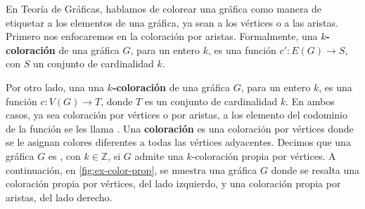 En Teor\'ia de Gr\'aficas, hablamos de colorear una gr\'afica como manera de
etiquetar a los elementos de una gr\'afica, ya sean a los v\'ertices o a las
aristas. Primero nos enfocaremos en la coloraci\'on por aristas. Formalmente,
una \textbf{$k$-coloraci\'on}  de una gr\'afica $G$, para un entero $k$,
es una funci\'on $c' \colon E(G)\to S$, con $S$ un conjunto de cardinalidad $k$.

Por otro lado, una una \textbf{$k$-coloraci\'on}
 de
una gr\'afica $G$, para un entero $k$, es una funci\'on $c \colon V(G)\to T$,
donde $T$ es un conjunto de cardinalidad $k$. En ambos casos, ya sea
coloraci\'on por v\'ertices o por aristas, a los elemento del codominio de la
funci\'on se les llama . Una \textbf{coloraci\'on}
 es una coloraci\'on por
v\'ertices donde se le asignan colores diferentes a todas las v\'ertices
adyacentes. Decimos que una gr\'afica $G$ es
, con $k \in \mathbb{Z}$, si $G$ admite una
$k$-coloraci\'on propia por v\'ertices. A continuaci\'on, en
\cref{fig:ex-color-prop}, se muestra una gr\'afica $G$ donde se resalta una
coloraci\'on propia por v\'ertices, del lado izquierdo, y una coloraci\'on
propia por aristas, del lado derecho. 

